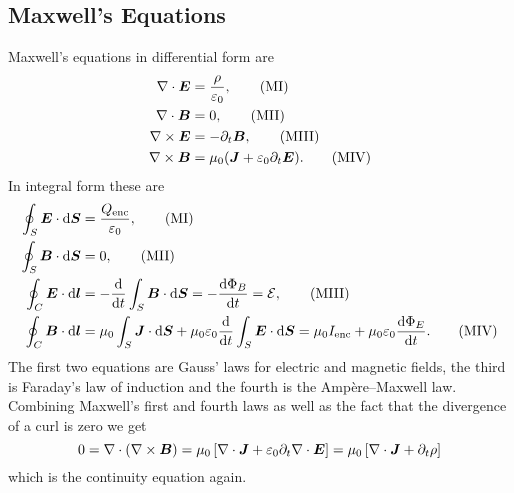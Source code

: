     \subsection{Maxwell's Equations}
    Maxwell's equations in differential form are
    \begin{align*}
        \nabla\cdot \bm{E} &= \frac{\rho}{\varepsilon_0},\tag{MI}\\
        \nabla\cdot \bm{B} &= 0,\tag{MII}\\
        \nabla\times\bm{E} &= -\partial_t\bm{B},\tag{MIII}\\
        \nabla\times\bm{B} &= \mu_0(\bm{J} + \varepsilon_0\partial_t\bm{E}).\tag{MIV}\\
    \end{align*}
    In integral form these are
    \begin{align*}
        \oint_S \bm{E}\cdot\dd{\bm{S}} &= \frac{Q_{\mathrm{enc}}}{\varepsilon_0}, \tag{MI}\\
        \oint_S \bm{B}\cdot\dd{\bm{S}} &= 0, \tag{MII}\\
        \oint_C \bm{E}\cdot\dd{\bm{l}} &= -\dv{t}\int_S \bm{B}\cdot\dd{\bm{S}} = -\dv{\Phi_B}{t} = \mathcal{E}, \tag{MIII}\\
        \oint_C \bm{B}\cdot\dd{\bm{l}} &= \mu_0\int_S\bm{J}\cdot\dd{\bm{S}} + \mu_0\varepsilon_0\dv{t}\int_S \bm{E}\cdot\dd{\bm{S}} = \mu_0I_{{\mathrm{enc}}} + \mu_0\varepsilon_0\dv{\Phi_E}{t}. \tag{MIV}
    \end{align*}
    The first two equations are Gauss' laws for electric and magnetic fields, the third is Faraday's law of induction and the fourth is the Amp\`ere--Maxwell law.
    Combining Maxwell's first and fourth laws as well as the fact that the divergence of a curl is zero we get
    \[0 = \nabla\cdot(\nabla\times\bm{B}) = \mu_0\left[\nabla\cdot\bm{J} + \varepsilon_0 \partial_t\nabla\cdot\bm{E} \right] = \mu_0\left[\nabla\cdot\bm{J} + \partial_t\rho\right]\]
    which is the continuity equation again.
